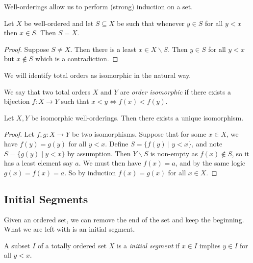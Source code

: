 \documentclass[a3paper, 10pt]{article}
\renewcommand{\vocab}[1]{\emph{#1}}
\begin{document}
\begin{multicols*}{5}
Well-orderings allow us to perform (strong) induction on a set.

\begin{proposition}
  Let $X$ be well-ordered and let $S \subseteq X$ be such that whenever $y \in S$ for all $y < x$ then $x \in S$. Then $S = X$.
\end{proposition}
\begin{proof}
  Suppose $S \neq X$. Then there is a least $x \in X \backslash S$. Then $y \in S$ for all $y < x$ but $x \not \in S$ which is a contradiction.
\end{proof}

We will identify total orders as isomorphic in the natural way.


\begin{definition}
  We say that two total orders $X$ and $Y$ are \vocab{order isomorphic} if there exists a bijection $f: X \rightarrow Y$ such that $x < y \iff f(x) < f(y)$.
\end{definition}

\begin{proposition}
  Let $X, Y$ be isomorphic well-orderings. Then there exists a unique isomorphism.
\end{proposition}
\begin{proof}
  Let $f, g: X \rightarrow Y$ be two isomorphisms. Suppose that for some $x \in X$, we have $f(y) = g(y)$ for all $y < x$. Define $S = \{f(y) \mid y < x\}$, and note $S = \{g(y) \mid y < x\}$ by assumption.
  Then $Y \backslash S$ is non-empty as $f(x) \not \in S$, so it has a least element say $a$. We must then have $f(x) = a$, and by the same logic $g(x) = f(x) = a$. So by induction $f(x) = g(x)$ for all $x \in X$.
\end{proof}

\subsection{Initial Segments}

Given an ordered set, we can remove the end of the set and keep the beginning. What we are left with is an initial segment.

\begin{definition}
  A subset $I$ of a totally ordered set $X$ is a \vocab{initial segment} if $x \in I$ implies $y \in I$ for all $y < x$.
\end{definition}


\end{multicols*}
\end{document}
